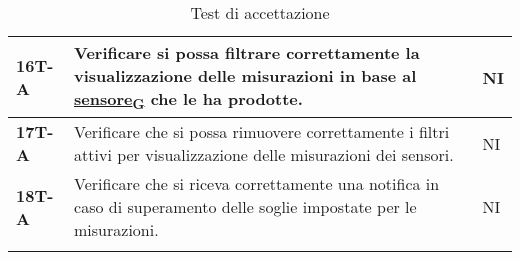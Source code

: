 \begin{longtable}{|>{\raggedright\arraybackslash}m{}|>{\raggedright\arraybackslash}m{}|>{\raggedright\arraybackslash}m{}|}
	\hline
	\textbf{16T-A}  & Verificare si possa filtrare correttamente la visualizzazione delle misurazioni in base al \href{https://7last.github.io/docs/pb/documentazione-interna/glossario\#sensore}{sensore\textsubscript{G}} che le ha prodotte. & NI             \\
	\hline
	\textbf{17T-A}  & Verificare che si possa rimuovere correttamente i filtri attivi per visualizzazione delle misurazioni dei sensori.     & NI             \\
	\hline
	\textbf{18T-A}  & Verificare che si riceva correttamente una notifica in caso di superamento delle soglie impostate per le misurazioni.  & NI             \\
	\hline
	\caption{Test di accettazione}
\end{longtable}
